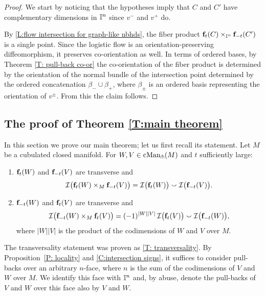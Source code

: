 \begin{proof}
	We start by noticing that the hypotheses imply that $C$ and $C'$ have complementary dimensions in $\mathbb{I}^n$ since $v^-$ and $v^+$ do.

	By \cref{L:flow intersection for graph-like nbhds}, the fiber product $\mathbf{f}_t(C) \times_{\mathbb{I}^n} \mathbf{f}_{-t}(C^\prime)$ is a single point.
	Since the logistic flow is an orientation-preserving diffeomorphism, it preserves co-orientation as well.
	In terms of ordered bases, by Theorem \ref{T: pull-back co-or} the co-orientation of the fiber product is determined by the orientation of the normal bundle of the intersection point determined by the ordered concatenation $\beta_- \cup \beta_+$, where $\beta_\pm$ is an ordered basis representing the orientation of $v^\pm$.
	From this the claim follows.
\end{proof}

\subsection{The proof of Theorem \ref{T:main theorem}}

In this section we prove our main theorem; let us first recall its statement.
Let $M$ be a cubulated closed manifold.
For $W, V \in \mathrm{cMan}_\pitchfork(M)$ and $t$ sufficiently large:
\begin{enumerate}
	\item $\mathbf{f}_t(W)$ and $\mathbf{f}_{-t}(V)$ are transverse and
	\begin{equation*}
		\mathcal{I} \big( \mathbf{f}_t(W) \times_M \mathbf{f}_{-t}(V) \big) =
		\mathcal{I} \big( \mathbf{f}_t(W) \big) \smallsmile \mathcal{I} \big( \mathbf{f}_{-t}(V) \big).
	\end{equation*}
	\item $\mathbf{f}_{-t}(W)$ and $\mathbf{f}_t(V)$ are transverse and
	\begin{equation*}
		\mathcal{I} \big( \mathbf{f}_{-t}(W) \times_M \mathbf{f}_t(V) \big) =
		(-1)^{|W||V|} \, \mathcal{I} \big( \mathbf{f}_t(V) \big) \smallsmile \mathcal{I} \big( \mathbf{f}_{-t}(W) \big),
	\end{equation*}
	where $|W||V|$ is the product of the codimensions of $W$ and $V$ over $M$.
\end{enumerate}

The transversality statement was proven as \cref{T: transversality}.
By Proposition~\ref{P: locality} and \cref{C:intersection signs}, it suffices to consider pull-backs over an arbitrary $n$-face, where $n$ is the sum of the codimensions of $V$ and $W$ over $M$.
We identify this face with $\mathbb{I}^n$ and, by abuse, denote the pull-backs of $V$ and $W$ over this face also by $V$ and $W$.

